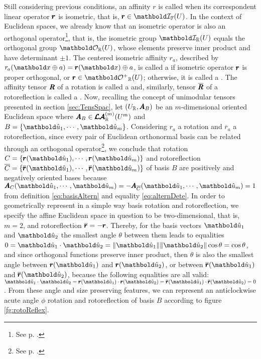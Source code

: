 Still considering previous conditions, an affinity $\mathit{r}$ is called  when its correspondent linear operator $\pmb{r}$ is isometric, that is, $\vtf{r}\in\grc{I}{\cam{F}}{U}$. In the context of Euclidean spaces, we already know that an isometric operator is also an orthogonal operator\footnote{See p. \pageref{prg:IsometOrth}.}, that is, the isometric group $\grc{I}{\real}{U}$ equals the orthogonal group $\grc{O}{\real}{U}$, whose elements preserve inner product and have determinant $\pm 1$. The centered isometric affinity $\mathit{r}_a$, described by $\fua{\mathit{r}_a}{\vto{x}\oplus a}=\fua{\vtf{r}}{\vto{x}}\oplus a$, is called a  if isometric operator $\pmb{r}$ is proper orthogonal, or $\vtf{r}\in\grc{O^+}{\real}{U}$; otherwise, it is called a . The affinity tensor $\pmb{R}$ of a rotation is called a  and, similarly, tensor $\overline{\pmb{R}}$ of a rotoreflection is called a . Now, recalling the concept of unimodular tensors presented in section \ref{sec:TensSpac}, let $(U_{\mathbb{R}},\pmb{A}_B)$ be an $m$-dimensional oriented Euclidean space where $\pmb{A}_B\in\pmb{\mathcal{LA}}^{(m)}_{\mathbb{R}}(U^m)$ and $B=\{\vun{u}_1,\cdots,\vun{u}_m\}$. Considering $\mathit{r}_a$ a rotation and $\overline{\mathit{r}}_a$ a rotoreflection, since every pair of Euclidean orthonormal basis can be related through an orthogonal operator\footnote{See p. \pageref{prg:orthBases}.}, we conclude that rotation  $C=\{\fua{\vtf{r}}{\vun{u}_1},\cdots,\fua{\vtf{r}}{\vun{u}_m}\}$ and rotoreflection $\overline{C}=\{\fua{\overline{\vtf{r}}}{\vun{u}_1},\cdots,\fua{\overline{\vtf{r}}}{\vun{u}_m}\}$ of basis $B$ are positively and negatively oriented bases because $\fua{\tnr{A}_C}{\vun{u}_1,\cdots,\vun{u}_m}=-\fua{\tnr{A}_{\overline{C}}}{\vun{u}_1,\cdots,\vun{u}_m}=1$ from definition \eqref{eq:basisAltern} and equality \eqref{eq:alternDete}. In order to geometrically represent in a simple way basis rotation and rotoreflection, we specify the affine Euclidean space in question to be two-dimensional, that is, $m=2$, and rotoreflection $\overline{\pmb{r}}=-\pmb{r}$. Thereby, for the basis vectors $\vun{u}_1$ and $\vun{u}_2$ the smallest angle $\theta$ between them leads to equalities $0=\vun{u}_1\cdot\vun{u}_2=\|\vun{u}_1\|\|\vun{u}_2\|\cos\theta=\cos\theta$, and since orthogonal functions preserve inner product, then $\theta$ is also the smallest angle between $\fua{\vtf{r}}{\vun{u}_1}$ and $\fua{\vtf{r}}{\vun{u}_2}$, or between $\fua{\overline{\vtf{r}}}{\vun{u}_1}$ and $\fua{\overline{\vtf{r}}}{\vun{u}_2}$, because the following equalities are all valid: $\vun{u}_1\cdot\vun{u}_2=\fua{\vtf{r}}{\vun{u}_1}\cdot\fua{\vtf{r}}{\vun{u}_2}=\fua{\overline{\vtf{r}}}{\vun{u}_1}\cdot\fua{\overline{\vtf{r}}}{\vun{u}_2}=0$. From these angle and size preserving features, we can represent an anticlockwise acute angle $\phi$ rotation and rotoreflection of basis $B$ according to figure \ref{fg:rotoReflex}.
